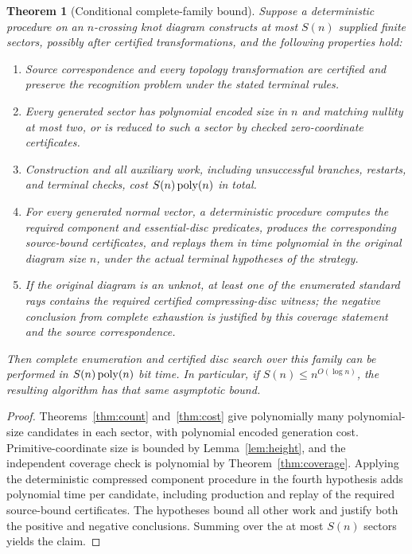 \documentclass[11pt]{article}
\newtheorem{theorem}{Theorem}[section]
\theoremstyle{definition}
\theoremstyle{remark}
\begin{document}
\begin{theorem}[Conditional complete-family bound]
\label{thm:conditional}
Suppose a deterministic procedure on an $n$-crossing knot diagram constructs
at most $S(n)$ supplied finite sectors, possibly after certified transformations,
and the following properties hold:
\begin{enumerate}
\item Source correspondence and every topology transformation are certified
and preserve the recognition problem under the stated terminal rules.
\item Every generated sector has polynomial encoded size in $n$ and matching
nullity at most two, or is reduced to such a sector by checked zero-coordinate
certificates.
\item Construction and all auxiliary work, including unsuccessful branches,
restarts, and terminal checks, cost $S(n)\operatorname{poly}(n)$ in total.
\item For every generated normal vector, a deterministic procedure computes
the required component and essential-disc predicates, produces the
corresponding source-bound certificates, and replays them in time polynomial
in the original diagram size $n$, under the actual terminal hypotheses of
the strategy.
\item If the original diagram is an unknot, at least one of the enumerated
standard rays contains the required certified compressing-disc witness;
the negative conclusion from complete exhaustion is justified by this
coverage statement and the source correspondence.
\end{enumerate}
Then complete enumeration and certified disc search over this family can be
performed in $S(n)\operatorname{poly}(n)$ bit time. In particular, if
$S(n)\le n^{O(\log n)}$, the resulting algorithm has that same asymptotic
bound.
\end{theorem}

\begin{proof}
Theorems~\ref{thm:count} and~\ref{thm:cost} give polynomially many
polynomial-size candidates in each sector, with polynomial encoded generation
cost. Primitive-coordinate size is bounded by Lemma~\ref{lem:height}, and
the independent coverage check is polynomial by
Theorem~\ref{thm:coverage}. Applying the deterministic compressed component
procedure in the fourth hypothesis adds polynomial time per candidate,
including production and replay of the required source-bound certificates.
The hypotheses bound all other work and justify both the positive and
negative conclusions. Summing over the at most $S(n)$ sectors yields the
claim.
\end{proof}
\end{document}
